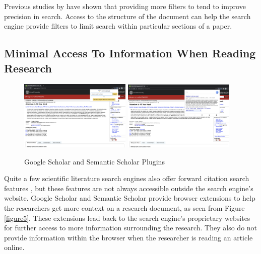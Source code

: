 Previous studies by \parencite{kacem2018analysis} have shown that providing more filters to tend to improve precision in search. Access to the structure of the document can help the search engine provide filters to limit search within particular sections of a paper.

\pagebreak
\subsection{Minimal Access To Information When Reading Research}

\begin{figure}[h]
    \includegraphics[width=0.475\textwidth]{src/images/gg-plugin.png}
    \hfill
    \includegraphics[width=0.475\textwidth]{src/images/ss-plugin.png}
    \caption{ Google Scholar and Semantic Scholar Plugins }
    \label{figure\arabic{figurecounter}}
\end{figure}
Quite a few scientific literature search engines also offer forward citation search features \parencite{gusenbauer2020academic}, but these features are not always accessible outside the search engine’s website. 
Google Scholar and Semantic Scholar provide browser extensions to help the researchers get more context on a research document, as seen from Figure \ref{figure5}. 
These extensions lead back to the search engine's proprietary websites for further access to more information surrounding the research. They also do not provide information within the browser when the researcher is reading an article online. 
